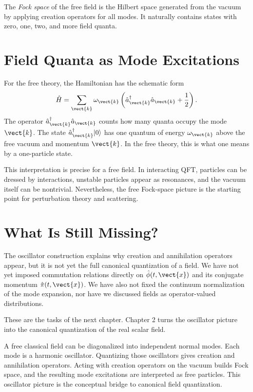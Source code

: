 \begin{definitionbox}
The \emph{Fock space} of the free field is the Hilbert space generated from the
vacuum by applying creation operators for all modes. It naturally contains
states with zero, one, two, and more field quanta.
\end{definitionbox}

\section{Field Quanta as Mode Excitations}

For the free theory, the Hamiltonian has the schematic form
\[
    \hat H
    = \sum_{\vect{k}}\omega_{\vect{k}}
    \left(
        \hat a_{\vect{k}}^\dagger\hat a_{\vect{k}}
        + \frac{1}{2}
    \right).
\]
The operator \(\hat a_{\vect{k}}^\dagger\hat a_{\vect{k}}\) counts how many
quanta occupy the mode \(\vect{k}\). The state
\(\hat a_{\vect{k}}^\dagger|0\rangle\) has one quantum of energy
\(\omega_{\vect{k}}\) above the free vacuum and momentum \(\vect{k}\). In the
free theory, this is what one means by a one-particle state.

This interpretation is precise for a free field. In interacting QFT, particles
can be dressed by interactions, unstable particles appear as resonances, and the
vacuum itself can be nontrivial. Nevertheless, the free Fock-space picture is
the starting point for perturbation theory and scattering.

\section{What Is Still Missing?}

The oscillator construction explains why creation and annihilation operators
appear, but it is not yet the full canonical quantization of a field. We have
not yet imposed commutation relations directly on
\(\hat\phi(t,\vect{x})\) and its conjugate momentum
\(\hat\pi(t,\vect{x})\). We have also not fixed the continuum normalization of
the mode expansion, nor have we discussed fields as operator-valued
distributions.

These are the tasks of the next chapter. Chapter 2 turns the oscillator picture
into the canonical quantization of the real scalar field.

\begin{summarybox}
A free classical field can be diagonalized into independent normal modes. Each
mode is a harmonic oscillator. Quantizing those oscillators gives creation and
annihilation operators. Acting with creation operators on the vacuum builds Fock
space, and the resulting mode excitations are interpreted as free particles.
This oscillator picture is the conceptual bridge to canonical field
quantization.
\end{summarybox}

